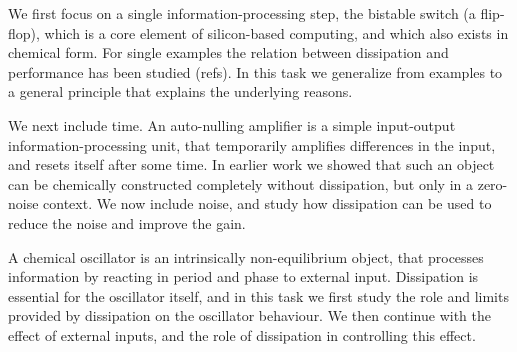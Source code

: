 \begin{workpackage}[id=WPkinetic,wphases=0-48,
short=Dissipation,
title=Harnessing dissipation,
lead=TUE,
TUERM=36]
\begin{wpdescription}
%
%

\end{wpdescription}


\begin{tasklist}


  \begin{task}[title=Dissipation in the bistable switch]
  We first focus on a single information-processing step, the bistable switch (a flip-flop), which is a core element of silicon-based computing, and which also exists in chemical form. For single examples the relation between dissipation and performance has been studied (refs). In this task we generalize from examples to a general principle that explains the underlying reasons.
  \end{task}

  \begin{task}[title=Role of dissipation in time]
  We next include time. An auto-nulling amplifier is a simple input-output information-processing unit, that temporarily amplifies differences in the input, and resets itself after some time. In earlier work we showed that such an object can be chemically constructed completely without dissipation, but only in a zero-noise context. We now include noise, and study how dissipation can be used to reduce the noise and improve the gain.  \end{task}
  
  \begin{task}[title=Dissipation in an oscillator]
A chemical oscillator is an intrinsically non-equilibrium object, that processes information by reacting in period and phase to external input. Dissipation is essential for the oscillator itself, and in this task we first study the role and limits provided by dissipation on the oscillator behaviour. We then continue with the effect of external inputs, and the role of dissipation in controlling this effect.    \end{task}
  

\end{tasklist}


\end{workpackage}

